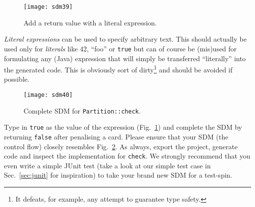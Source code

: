 \begin{figure}[htbp]
\begin{center}
  \texttt{[image: sdm39]}
  \caption{Add a return value with a literal expression.}
  \label{fig:sdm_check_literal_exp}
\end{center}
\end{figure}

\emph{Literal expressions} can be used to specify arbitrary text.  This should actually be used only for \emph{literals} like 42, ``foo'' or \texttt{true} but
can of course be (mis)used for formulating any (Java) expression that will simply be transferred ``literally'' into the  generated code.
This is obviously sort of dirty\footnote{It defeats, for example, any attempt to guarantee type safety.} and should be avoided if possible.

\begin{figure}[htbp]
\begin{center}
  \texttt{[image: sdm40]}
  \caption{Complete SDM for \texttt{Partition::check}.}
  \label{fig:sdm_check_finish}
\end{center}
\end{figure}

Type in \texttt{true} as the value of the expression (Fig.~\ref{fig:sdm_check_literal_exp}) and complete the SDM by returning \texttt{false} after penalising a
card.  Please ensure that your SDM (the control flow) closely resembles Fig.~\ref{fig:sdm_check_finish}.
As always, export the project, generate code and inspect the implementation for \texttt{check}.  We strongly recommend that you even write a simple JUnit test
(take a look at our simple test case in Sec.~\ref{sec:junit} for inspiration) to take your brand new SDM for a test-spin.
